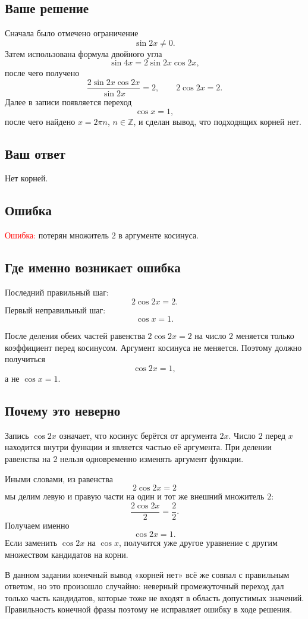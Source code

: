 \documentclass[12pt,a4paper]{article}
\begin{document}
\subsection*{Ваше решение}
Сначала было отмечено ограничение
\[
\sin 2x\ne 0.
\]
Затем использована формула двойного угла
\[
\sin 4x=2\sin 2x\cos 2x,
\]
после чего получено
\[
\frac{2\sin 2x\cos 2x}{\sin 2x}=2,
\qquad
2\cos 2x=2.
\]
Далее в записи появляется переход
\[
\cos x=1,
\]
после чего найдено $x=2\pi n$, $n\in\mathbb Z$, и сделан вывод, что подходящих корней нет.

\subsection*{Ваш ответ}
Нет корней.

\subsection*{Ошибка}
\textcolor{red}{Ошибка:} потерян множитель $2$ в аргументе косинуса.

\subsection*{Где именно возникает ошибка}
Последний правильный шаг:
\[
2\cos 2x=2.
\]
Первый неправильный шаг:
\[
\cos x=1.
\]

После деления обеих частей равенства $2\cos 2x=2$ на число $2$ меняется только коэффициент перед косинусом. Аргумент косинуса не меняется. Поэтому должно получиться
\[
\cos 2x=1,
\]
а не $\cos x=1$.

\subsection*{Почему это неверно}
Запись $\cos 2x$ означает, что косинус берётся от аргумента $2x$. Число $2$ перед $x$ находится внутри функции и является частью её аргумента. При делении равенства на $2$ нельзя одновременно изменять аргумент функции.

Иными словами, из равенства
\[
2\cos 2x=2
\]
мы делим левую и правую части на один и тот же внешний множитель $2$:
\[
\frac{2\cos 2x}{2}=\frac{2}{2}.
\]
Получаем именно
\[
\cos 2x=1.
\]
Если заменить $\cos 2x$ на $\cos x$, получится уже другое уравнение с другим множеством кандидатов на корни.

В данном задании конечный вывод «корней нет» всё же совпал с правильным ответом, но это произошло случайно: неверный промежуточный переход дал только часть кандидатов, которые тоже не входят в область допустимых значений. Правильность конечной фразы поэтому не исправляет ошибку в ходе решения.
\end{document}
